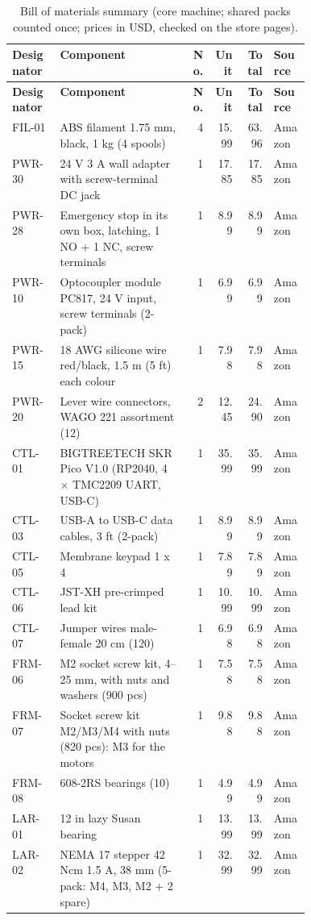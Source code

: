{\small\begin{longtable}{|l|p{0.43\linewidth}|r|r|r|l|}\caption{Bill of materials summary (core machine; shared packs counted once; prices in USD, checked on the store pages).}\label{tab:bom}\\\hline
\textbf{Designator} & \textbf{Component} & \textbf{No.} & \textbf{Unit} & \textbf{Total} & \textbf{Source} \\ \hline\endfirsthead
\hline\textbf{Designator} & \textbf{Component} & \textbf{No.} & \textbf{Unit} & \textbf{Total} & \textbf{Source} \\ \hline\endhead
FIL-01 & ABS filament 1.75 mm, black, 1 kg (4 spools) & 4 & 15.99 & 63.96 & Amazon \\
PWR-30 & 24 V 3 A wall adapter with screw-terminal DC jack & 1 & 17.85 & 17.85 & Amazon \\
PWR-28 & Emergency stop in its own box, latching, 1 NO + 1 NC, screw terminals & 1 & 8.99 & 8.99 & Amazon \\
PWR-10 & Optocoupler module PC817, 24 V input, screw terminals (2-pack) & 1 & 6.99 & 6.99 & Amazon \\
PWR-15 & 18 AWG silicone wire red/black, 1.5 m (5 ft) each colour & 1 & 7.98 & 7.98 & Amazon \\
PWR-20 & Lever wire connectors, WAGO 221 assortment (12) & 2 & 12.45 & 24.90 & Amazon \\
CTL-01 & BIGTREETECH SKR Pico V1.0 (RP2040, 4 $\times$ TMC2209 UART, USB-C) & 1 & 35.99 & 35.99 & Amazon \\
CTL-03 & USB-A to USB-C data cables, 3 ft (2-pack) & 1 & 8.99 & 8.99 & Amazon \\
CTL-05 & Membrane keypad 1 x 4 & 1 & 7.89 & 7.89 & Amazon \\
CTL-06 & JST-XH pre-crimped lead kit & 1 & 10.99 & 10.99 & Amazon \\
CTL-07 & Jumper wires male-female 20 cm (120) & 1 & 6.98 & 6.98 & Amazon \\
FRM-06 & M2 socket screw kit, 4--25 mm, with nuts and washers (900 pcs) & 1 & 7.58 & 7.58 & Amazon \\
FRM-07 & Socket screw kit M2/M3/M4 with nuts (820 pcs): M3 for the motors & 1 & 9.88 & 9.88 & Amazon \\
FRM-08 & 608-2RS bearings (10) & 1 & 4.99 & 4.99 & Amazon \\
LAR-01 & 12 in lazy Susan bearing & 1 & 13.99 & 13.99 & Amazon \\
LAR-02 & NEMA 17 stepper 42 Ncm 1.5 A, 38 mm (5-pack: M4, M3, M2 + 2 spare) & 1 & 32.99 & 32.99 & Amazon \\

\end{longtable}}
